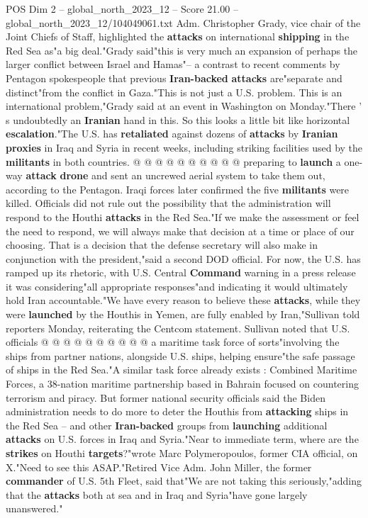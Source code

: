 \begin{textsample}{POS Dim 2 – global\_north\_2023\_12 – Score 21.00 – global\_north\_2023\_12/104049061.txt}
Adm.
Christopher Grady, vice chair of the Joint Chiefs of Staff, highlighted the \textbf{attacks} on international \textbf{shipping} in the Red Sea as"a big deal."Grady said"this is very much an expansion of perhaps the larger conflict between Israel and Hamas"-- a contrast to recent comments by Pentagon spokespeople that previous \textbf{Iran-backed} \textbf{attacks} are"separate and distinct"from the conflict in Gaza."This is not just a U.S. problem.
This is an international problem,"Grady said at an event in Washington on Monday."There ' s undoubtedly an \textbf{Iranian} hand in this.
So this looks a little bit like horizontal \textbf{escalation}."The U.S. has \textbf{retaliated} against dozens of \textbf{attacks} by \textbf{Iranian} \textbf{proxies} in Iraq and Syria in recent weeks, including striking facilities used by the \textbf{militants} in both countries. @ @ @ @ @ @ @ @ @ @ preparing to \textbf{launch} a one-way \textbf{attack} \textbf{drone} and sent an uncrewed aerial system to take them out, according to the Pentagon.
Iraqi forces later confirmed the five \textbf{militants} were killed.
Officials did not rule out the possibility that the administration will respond to the Houthi \textbf{attacks} in the Red Sea."If we make the assessment or feel the need to respond, we will always make that decision at a time or place of our choosing.
That is a decision that the defense secretary will also make in conjunction with the president,"said a second DOD official.
For now, the U.S. has ramped up its rhetoric, with U.S.
Central \textbf{Command} warning in a press release it was considering"all appropriate responses"and indicating it would ultimately hold Iran accountable."We have every reason to believe these \textbf{attacks}, while they were \textbf{launched} by the Houthis in Yemen, are fully enabled by Iran,"Sullivan told reporters Monday, reiterating the Centcom statement.
Sullivan noted that U.S. officials @ @ @ @ @ @ @ @ @ @ a maritime task force of sorts"involving the ships from partner nations, alongside U.S. ships, helping ensure"the safe passage of ships in the Red Sea."A similar task force already exists : Combined Maritime Forces, a 38-nation maritime partnership based in Bahrain focused on countering terrorism and piracy.
But former national security officials said the Biden administration needs to do more to deter the Houthis from \textbf{attacking} ships in the Red Sea -- and other \textbf{Iran-backed} groups from \textbf{launching} additional \textbf{attacks} on U.S. forces in Iraq and Syria."Near to immediate term, where are the \textbf{strikes} on Houthi \textbf{targets}?"wrote Marc Polymeropoulos, former CIA official, on X."Need to see this ASAP."Retired Vice Adm.
John Miller, the former \textbf{commander} of U.S. 5th Fleet, said that"We are not taking this seriously,"adding that the \textbf{attacks} both at sea and in Iraq and Syria"have gone largely unanswered."

\end{textsample}
